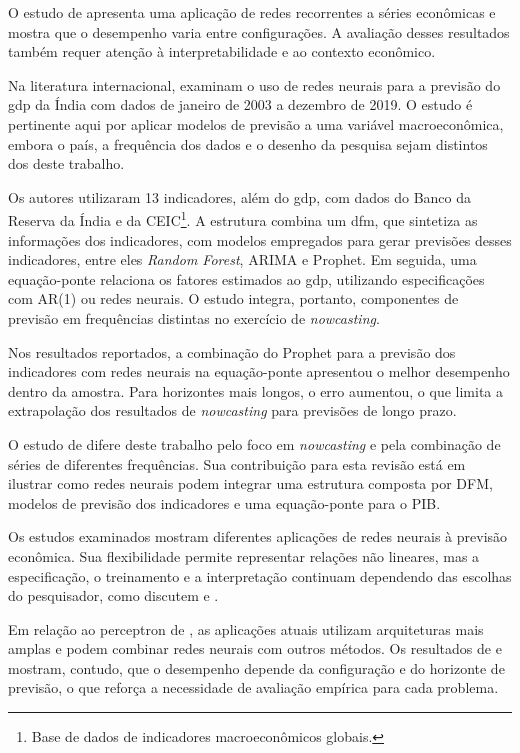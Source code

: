 O estudo de  apresenta uma aplicação de redes recorrentes a séries econômicas e mostra que o desempenho varia entre configurações. A avaliação desses resultados também requer atenção à interpretabilidade e ao contexto econômico.

Na literatura internacional,  examinam o uso de redes neurais para a previsão do \ac{gdp} da Índia com dados de janeiro de 2003 a dezembro de 2019. O estudo é pertinente aqui por aplicar modelos de previsão a uma variável macroeconômica, embora o país, a frequência dos dados e o desenho da pesquisa sejam distintos dos deste trabalho.

Os autores utilizaram 13 indicadores, além do \ac{gdp}, com dados do Banco da Reserva da Índia e da CEIC\footnote{Base de dados de indicadores macroeconômicos globais.}. A estrutura combina um \ac{dfm}, que sintetiza as informações dos indicadores, com modelos empregados para gerar previsões desses indicadores, entre eles \textit{Random Forest}, ARIMA e Prophet. Em seguida, uma equação-ponte relaciona os fatores estimados ao \ac{gdp}, utilizando especificações com AR(1) ou redes neurais. O estudo integra, portanto, componentes de previsão em frequências distintas no exercício de \textit{nowcasting}.

Nos resultados reportados, a combinação do Prophet para a previsão dos indicadores com redes neurais na equação-ponte apresentou o melhor desempenho dentro da amostra. Para horizontes mais longos, o erro aumentou, o que limita a extrapolação dos resultados de \textit{nowcasting} para previsões de longo prazo.

O estudo de  difere deste trabalho pelo foco em \textit{nowcasting} e pela combinação de séries de diferentes frequências. Sua contribuição para esta revisão está em ilustrar como redes neurais podem integrar uma estrutura composta por DFM, modelos de previsão dos indicadores e uma equação-ponte para o PIB.

Os estudos examinados mostram diferentes aplicações de redes neurais à previsão econômica. Sua flexibilidade permite representar relações não lineares, mas a especificação, o treinamento e a interpretação continuam dependendo das escolhas do pesquisador, como discutem  e .

Em relação ao perceptron de , as aplicações atuais utilizam arquiteturas mais amplas e podem combinar redes neurais com outros métodos. Os resultados de  e  mostram, contudo, que o desempenho depende da configuração e do horizonte de previsão, o que reforça a necessidade de avaliação empírica para cada problema.

